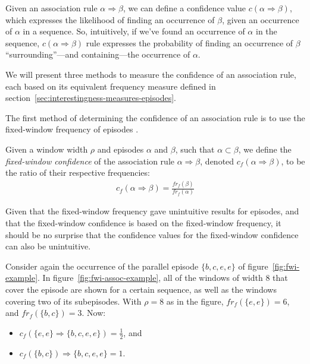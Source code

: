 Given an association rule $ \alpha \Rightarrow \beta $, we can define a confidence value $ c(\alpha \Rightarrow \beta) $, which expresses the likelihood of finding an occurrence of $ \beta $, given an occurrence of $ \alpha $ in a sequence. So, intuitively, if we've found an occurrence of $ \alpha $ in the sequence, $ c(\alpha \Rightarrow \beta) $ rule expresses the probability of finding an occurrence of $ \beta $ ``surrounding''---and containing---the occurrence of $ \alpha $.

We will present three methods to measure the confidence of an association rule, each based on its equivalent frequency measure defined in section~\ref{sec:interestingness-measures-episodes}.

The first method of determining the confidence of an association rule is to use the fixed-window frequency of episodes \citep{mannila1997discovery}.

\begin{definition}
Given a window width $ \rho $ and episodes $ \alpha $ and $ \beta $, such that $ \alpha \subset \beta $, we define the \emph{fixed-window confidence} of the association rule $ \alpha \Rightarrow \beta $, denoted $ c_f(\alpha \Rightarrow \beta) $, to be the ratio of their respective frequencies:
\begin{align*}
c_f(\alpha \Rightarrow \beta) = \frac{ fr_f(\beta) }{ fr_f(\alpha) }
\end{align*}
\end{definition}

Given that the fixed-window frequency gave unintuitive results for episodes, and that the fixed-window confidence is based on the fixed-window frequency, it should be no surprise that the confidence values for the fixed-window confidence can also be unintuitive.

Consider again the occurrence of the parallel episode $ \{ b, c, e, e \} $ of figure~\ref{fig:fwi-example}. In figure~\ref{fig:fwi-assoc-example}, all of the windows of width $ 8 $ that cover the episode are shown for a certain sequence, as well as the windows covering two of its subepisodes. With $ \rho = 8 $ as in the figure, $ fr_f(\{ e, e \}) = 6 $, and $ fr_f(\{ b, c \}) = 3 $. Now:
\begin{itemize}
\item $ c_f(\{ e, e \} \Rightarrow \{ b, c, e, e \}) = \frac12 $, and
\item $ c_f(\{ b, c \}) \Rightarrow \{ b, c, e, e \} = 1 $.
\end{itemize}

